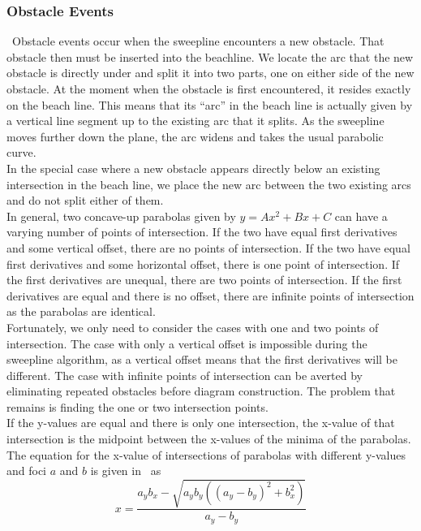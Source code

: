 \documentclass[conference]{IEEEtran}
\begin{document}
\subsubsection{Obstacle Events}\label{obstacle_events}
\noindent\ Obstacle events occur when the sweepline encounters a new obstacle. That obstacle then
must be inserted into the beachline. We locate the arc that the new obstacle is
directly under and split it into two parts, one on either side of the new obstacle.
At the moment when the obstacle is first encountered, it resides exactly on the
beach line. This means that its ``arc'' in the beach line is actually given by a
vertical line segment up to the existing arc that it splits. As the sweepline moves
further down the plane, the arc widens and takes the usual parabolic curve.\\
\indent In the special case where a new obstacle appears directly below an existing
intersection in the beach line, we place the new arc between the two existing arcs
and do not split either of them.\\
\indent In general, two concave-up parabolas given by $y=Ax^{2}+Bx+C$ can have a varying number of points
of intersection. If the two have equal first derivatives and some vertical offset,
there are no points of intersection. If the two have equal first derivatives and
some horizontal offset, there is one point of intersection. If the first derivatives
are unequal, there are two points of intersection. If the first derivatives are
equal and there is no offset, there are infinite points of intersection as the
parabolas are identical.\\
\indent Fortunately, we only need to consider the cases with one and two points
of intersection. The case with only a vertical offset is impossible during the
sweepline algorithm, as a vertical offset means that the first derivatives will
be different. The case with infinite points of intersection can be averted
by eliminating repeated obstacles before diagram construction. The problem
that remains is finding the one or two intersection points.\\
\indent If the y-values are equal and there is only one intersection, the x-value of that
intersection is the midpoint between the x-values of the minima of the parabolas.
The equation for the x-value of intersections of parabolas with different
y-values and foci $a$ and $b$ is given in~\cite{schaal} as
\begin{equation}
    x=\frac{a_{y}b_{x}-\sqrt{a_{y}b_{y}({(a_{y}-b_{y})}^{2}+b_{x}^{2})}}{a_{y}-b_{y}}
\end{equation}
\end{document}
